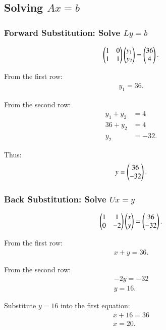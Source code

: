 \documentclass[journal,12pt,onecolumn]{IEEEtran}
\theoremstyle{remark}
\begin{document}
\subsection*{Solving $A{x} = {b}$}

\subsubsection*{Forward Substitution: Solve $Ly = b$}
\begin{align}
\begin{pmatrix}1 & 0 \\ 1 & 1\end{pmatrix}
\begin{pmatrix}y_1 \\ y_2\end{pmatrix}
=
\begin{pmatrix}36 \\ 4\end{pmatrix}.
\end{align}

From the first row:
\begin{align}
y_1 = 36.
\end{align}

From the second row:
\begin{align}
y_1 + y_2 &= 4 \\
36 + y_2 &= 4 \\
y_2 &= -32.
\end{align}

Thus:
\begin{align}
{y} = \begin{pmatrix}36 \\ -32\end{pmatrix}.
\end{align}

\subsubsection*{Back Substitution: Solve $Ux = y$}
\begin{align}
\begin{pmatrix}1 & 1 \\ 0 & -2\end{pmatrix}
\begin{pmatrix}x \\ y\end{pmatrix}
=
\begin{pmatrix}36 \\ -32\end{pmatrix}.
\end{align}

From the first row:
\begin{align}
x + y = 36.
\end{align}

From the second row:
\begin{align}
-2y = -32 \\
y = 16.
\end{align}

Substitute $y = 16$ into the first equation:
\begin{align}
x + 16 = 36 \\
x = 20.
\end{align}
\end{document}
